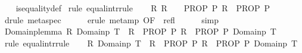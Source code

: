 \begin{isabellebody}
%
\isadelimproof
\ \ %
\endisadelimproof
%
\isatagproof
{}\isamarkupfalse%
\ is{\isacharunderscore}{\kern0pt}equality{\isacharunderscore}{\kern0pt}def\isanewline
{}\isamarkupfalse%
\ {\isacharparenleft}{\kern0pt}rule\ equal{\isacharunderscore}{\kern0pt}intr{\isacharunderscore}{\kern0pt}rule{\isacharparenright}{\kern0pt}\isanewline
\ \ \isamarkupfalse%
\ {\isachardoublequoteopen}{\isacharparenleft}{\kern0pt}{\isasymAnd}R{\isachardot}{\kern0pt}\ R\ {\isacharequal}{\kern0pt}\ {\isacharparenleft}{\kern0pt}{\isacharequal}{\kern0pt}{\isacharparenright}{\kern0pt}\ {\isasymLongrightarrow}\ PROP\ P\ R{\isacharparenright}{\kern0pt}\ {\isasymLongrightarrow}\ PROP\ P\ {\isacharparenleft}{\kern0pt}{\isacharequal}{\kern0pt}{\isacharparenright}{\kern0pt}{\isachardoublequoteclose}\isanewline
\ \ \ \ \isamarkupfalse%
\ {\isacharparenleft}{\kern0pt}drule\ meta{\isacharunderscore}{\kern0pt}spec{\isacharparenright}{\kern0pt}\isanewline
\ \ \ \ \isamarkupfalse%
\ {\isacharparenleft}{\kern0pt}erule\ meta{\isacharunderscore}{\kern0pt}mp\ {\isacharbrackleft}{\kern0pt}OF\ {\isacharunderscore}{\kern0pt}\ refl{\isacharbrackright}{\kern0pt}{\isacharparenright}{\kern0pt}\isanewline
\ \ \ \ \isamarkupfalse%
\isanewline
{}\isamarkupfalse%
\ simp%
\endisatagproof
{\isafoldproof}%
%
\isadelimproof
\isanewline
%
\endisadelimproof
\isanewline
{}\isamarkupfalse%
\ Domainp{\isacharunderscore}{\kern0pt}lemma{\isacharcolon}{\kern0pt}\ {\isachardoublequoteopen}{\isacharparenleft}{\kern0pt}{\isasymAnd}R{\isachardot}{\kern0pt}\ Domainp\ T\ {\isacharequal}{\kern0pt}\ R\ {\isasymLongrightarrow}\ PROP\ {\isacharparenleft}{\kern0pt}P\ R{\isacharparenright}{\kern0pt}{\isacharparenright}{\kern0pt}\ {\isasymequiv}\ PROP\ {\isacharparenleft}{\kern0pt}P\ {\isacharparenleft}{\kern0pt}Domainp\ T{\isacharparenright}{\kern0pt}{\isacharparenright}{\kern0pt}{\isachardoublequoteclose}\isanewline
%
\isadelimproof
%
\endisadelimproof
%
\isatagproof
{}\isamarkupfalse%
\ {\isacharparenleft}{\kern0pt}rule\ equal{\isacharunderscore}{\kern0pt}intr{\isacharunderscore}{\kern0pt}rule{\isacharparenright}{\kern0pt}\isanewline
\ \ \isamarkupfalse%
\ {\isachardoublequoteopen}{\isacharparenleft}{\kern0pt}{\isasymAnd}R{\isachardot}{\kern0pt}\ Domainp\ T\ {\isacharequal}{\kern0pt}\ R\ {\isasymLongrightarrow}\ PROP\ P\ R{\isacharparenright}{\kern0pt}\ {\isasymLongrightarrow}\ PROP\ P\ {\isacharparenleft}{\kern0pt}Domainp\ T{\isacharparenright}{\kern0pt}{\isachardoublequoteclose}\isanewline

\end{isabellebody}

